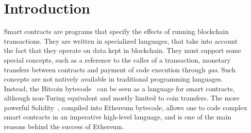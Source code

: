\section{Introduction}\label{sec:introduction}

Smart contracts are programs that specify the effects of running blockchain transactions.
They are written in specialized languages, that take into account
the fact that they operate on data kept in blockchain. They must
support some special concepts, such as a reference to the caller of a transaction,
monetary transfers between contracts
and payment of code execution through \emph{gas}.
Such concepts are not natively available
in traditional programming languages.
Instead, the Bitcoin bytecode~\cite{Antonopoulos17,Nakamoto08}
can be seen as a language for smart contracts,
although non-Turing equivalent and mostly limited to coin transfers. The more
powerful Solidity~\cite{AntonopoulosW18},
compiled into Ethereum bytecode, allows one to code
complex smart contracts in an imperative high-level language, and is
one of the main reasons behind the success of Ethereum.

